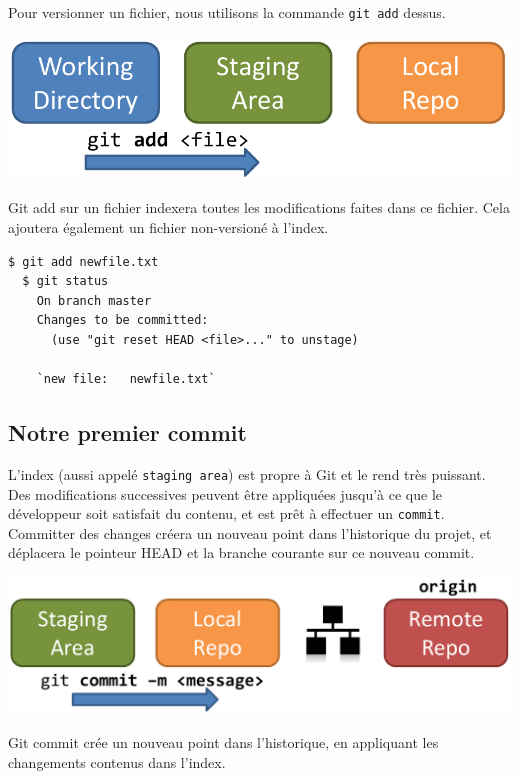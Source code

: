 \documentclass{../../common/tufte-latex/tufte-handout}
\begin{document}
Pour versionner un fichier, nous utilisons la commande \texttt{git add} dessus.

\begin{marginfigure}%
  \centering
  \includegraphics[width=\linewidth]{gitadd-schema.pdf}
  \label{fig:gitadd}
  \caption{Git add sur un fichier indexera toutes les modifications faites dans ce fichier. Cela ajoutera également un fichier non-versioné à l'index.}
\end{marginfigure}

\begin{lstlisting}[style=BashInputStyle]
  $ git add newfile.txt
  $ git status
    On branch master
    Changes to be committed:
      (use "git reset HEAD <file>..." to unstage)
  
    `new file:   newfile.txt`
\end{lstlisting}

\subsection{Notre premier commit}

L'index (aussi appelé \texttt{staging area}) est propre à Git et le rend très puissant.
Des modifications successives peuvent être appliquées jusqu'à ce que le développeur soit satisfait du contenu, et est prêt à effectuer un \texttt{commit}.
Committer des changes créera un nouveau point dans l'historique du projet, et déplacera le pointeur HEAD et la branche courante sur ce nouveau commit.

\begin{marginfigure}%
  \centering
  \includegraphics[width=\linewidth]{gitcommit-schema.pdf}
  \label{fig:gitcommit}
  \caption{Git commit crée un nouveau point dans l'historique, en appliquant les changements contenus dans l'index.}
\end{marginfigure}
\end{document}
